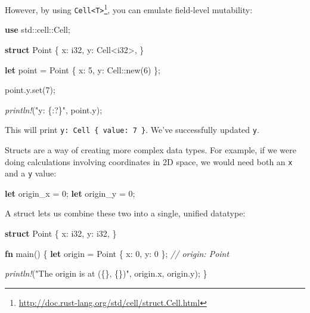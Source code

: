 \documentclass[a4paper,]{book}
\newenvironment{Shaded}{\begin{snugshade}}{\end{snugshade}}
\newcommand{\KeywordTok}[1]{\textcolor[rgb]{0.13,0.29,0.53}{\textbf{{#1}}}}
\newcommand{\DataTypeTok}[1]{\textcolor[rgb]{0.13,0.29,0.53}{{#1}}}
\newcommand{\DecValTok}[1]{\textcolor[rgb]{0.00,0.00,0.81}{{#1}}}
\newcommand{\StringTok}[1]{\textcolor[rgb]{0.31,0.60,0.02}{{#1}}}
\newcommand{\CommentTok}[1]{\textcolor[rgb]{0.56,0.35,0.01}{\textit{{#1}}}}
\newcommand{\PreprocessorTok}[1]{\textcolor[rgb]{0.56,0.35,0.01}{\textit{{#1}}}}
\newcommand{\NormalTok}[1]{{#1}}
\renewcommand{\href}[2]{#2\footnote{\url{#1}}}
\begin{document}
However, by using
\href{http://doc.rust-lang.org/std/cell/struct.Cell.html}{\texttt{Cell\textless{}T\textgreater{}}},
you can emulate field-level mutability:

\begin{Shaded}
\begin{Highlighting}[]
\KeywordTok{use} \NormalTok{std::cell::Cell;}

\KeywordTok{struct} \NormalTok{Point \{}
    \NormalTok{x: }\DataTypeTok{i32}\NormalTok{,}
    \NormalTok{y: Cell<}\DataTypeTok{i32}\NormalTok{>,}
\NormalTok{\}}

\KeywordTok{let} \NormalTok{point = Point \{ x: }\DecValTok{5}\NormalTok{, y: Cell::new(}\DecValTok{6}\NormalTok{) \};}

\NormalTok{point.y.set(}\DecValTok{7}\NormalTok{);}

\PreprocessorTok{println!}\NormalTok{(}\StringTok{"y: \{:?\}"}\NormalTok{, point.y);}
\end{Highlighting}
\end{Shaded}

This will print \texttt{y:\ Cell\ \{\ value:\ 7\ \}}. We've successfully
updated \texttt{y}.


Structs are a way of creating more complex data types. For example, if
we were doing calculations involving coordinates in 2D space, we would
need both an \texttt{x} and a \texttt{y} value:

\begin{Shaded}
\begin{Highlighting}[]
\KeywordTok{let} \NormalTok{origin_x = }\DecValTok{0}\NormalTok{;}
\KeywordTok{let} \NormalTok{origin_y = }\DecValTok{0}\NormalTok{;}
\end{Highlighting}
\end{Shaded}

A struct lets us combine these two into a single, unified datatype:

\begin{Shaded}
\begin{Highlighting}[]
\KeywordTok{struct} \NormalTok{Point \{}
    \NormalTok{x: }\DataTypeTok{i32}\NormalTok{,}
    \NormalTok{y: }\DataTypeTok{i32}\NormalTok{,}
\NormalTok{\}}

\KeywordTok{fn} \NormalTok{main() \{}
    \KeywordTok{let} \NormalTok{origin = Point \{ x: }\DecValTok{0}\NormalTok{, y: }\DecValTok{0} \NormalTok{\}; }\CommentTok{// origin: Point}

    \PreprocessorTok{println!}\NormalTok{(}\StringTok{"The origin is at (\{\}, \{\})"}\NormalTok{, origin.x, origin.y);}
\NormalTok{\}}
\end{Highlighting}
\end{Shaded}
\end{document}
